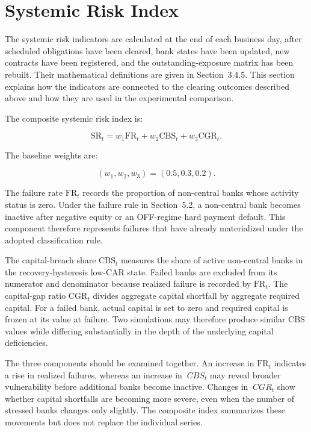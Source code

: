 \section{Systemic Risk Index}

The systemic risk indicators are calculated at the end of each business
day, after scheduled obligations have been cleared, bank states have
been updated, new contracts have been registered, and the
outstanding-exposure matrix has been rebuilt. Their mathematical
definitions are given in Section~3.4.5. This section explains how the
indicators are connected to the clearing outcomes described above and
how they are used in the experimental comparison.

The composite systemic risk index is:


\begin{equation}
\mathrm{SR}_t=w_1\mathrm{FR}_t+w_2\mathrm{CBS}_t+w_3\mathrm{CGR}_t.
\end{equation}


The baseline weights are:


\begin{equation}
\left(w_1,w_2,w_3\right)=\left(0.5,0.3,0.2\right).
\end{equation}


The failure rate \(\mathrm{FR}_t\) records the proportion of non-central banks
whose activity status is zero. Under the failure rule in Section~5.2, a
non-central bank becomes inactive after negative equity or an OFF-regime
hard payment default. This component therefore represents failures that
have already materialized under the adopted classification rule.

The capital-breach share \(\mathrm{CBS}_t\) measures the share of active
non-central banks in the recovery-hysteresis low-CAR state. Failed banks
are excluded from its numerator and denominator because realized failure
is recorded by \(\mathrm{FR}_t\). The capital-gap ratio
\(\mathrm{CGR}_t\) divides aggregate capital shortfall by aggregate required
capital. For a failed bank, actual capital is set to zero and required
capital is frozen at its value at failure. Two simulations may therefore
produce similar CBS values while differing substantially in the depth of
the underlying capital deficiencies.

The three components should be examined together. An increase in
\(\mathrm{FR}_t\) indicates a rise in realized failures, whereas an increase
in \({\ CBS}_{t}\) may reveal broader vulnerability before additional
banks become inactive. Changes in \({\ CGR}_{t}\) show whether capital
shortfalls are becoming more severe, even when the number of stressed
banks changes only slightly. The composite index summarizes these
movements but does not replace the individual series.

